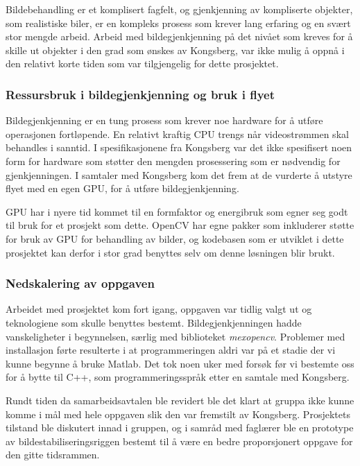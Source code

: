 Bildebehandling er et komplisert fagfelt, og gjenkjenning av kompliserte objekter, som realistiske biler, er en kompleks prosess som krever lang erfaring og en svært stor mengde arbeid. Arbeid med bildegjenkjenning på det nivået som kreves for å skille ut objekter i den grad som ønskes av Kongsberg, var ikke mulig å oppnå i den relativt korte tiden som var tilgjengelig for dette prosjektet.

\subsubsection{Ressursbruk i bildegjenkjenning og bruk i flyet}

Bildegjenkjenning er en tung prosess som krever noe hardware for å utføre operasjonen fortløpende. En relativt kraftig CPU trengs når videostrømmen skal behandles i sanntid. I spesifikasjonene fra Kongsberg \cite{LocalHawkPDF} var det ikke spesifisert noen form for hardware som støtter den mengden prosessering som er nødvendig for gjenkjenningen. I samtaler med Kongsberg kom det frem at de vurderte å utstyre flyet med en egen GPU, for å utføre bildegjenkjenning. 

GPU har i nyere tid kommet til en formfaktor og energibruk som egner seg godt til bruk for et prosjekt som dette. OpenCV har egne pakker som inkluderer støtte for bruk av GPU for behandling av bilder, og kodebasen som er utviklet i dette prosjektet kan derfor i stor grad benyttes selv om denne løsningen blir brukt.

\subsubsection{Nedskalering av oppgaven}
Arbeidet med prosjektet kom fort igang, oppgaven var tidlig valgt ut og teknologiene som skulle benyttes bestemt. Bildegjenkjenningen hadde vanskeligheter i begynnelsen, særlig med biblioteket \emph{mexopencv}. Problemer med installasjon førte resulterte i at programmeringen aldri var på et stadie der vi kunne begynne å bruke Matlab. Det tok noen uker med forsøk før vi bestemte oss for å bytte til C++, som programmeringsspråk etter en samtale med Kongsberg.

Rundt tiden da samarbeidsavtalen ble revidert ble det klart at gruppa ikke kunne komme i mål med hele oppgaven slik den var fremstilt av Kongsberg. Prosjektets tilstand ble diskutert innad i gruppen, og i samråd med faglærer ble en prototype av bildestabiliseringsriggen bestemt til å være en bedre proporsjonert oppgave for den gitte tidsrammen.

